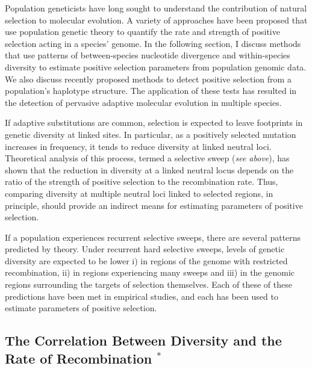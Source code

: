 Population geneticists have long sought to understand the contribution of natural selection to molecular evolution. A variety of approaches have been proposed that use population genetic theory to quantify the rate and strength of positive selection acting in a species’ genome. In the following section, I discuss methods that use patterns of between-species nucleotide divergence and within-species diversity to estimate positive selection parameters from population genomic data. We also discuss recently proposed methods to detect positive selection from a population’s haplotype structure. The application of these tests has resulted in the detection of pervasive adaptive molecular evolution in multiple species.
 
If adaptive substitutions are common, selection is expected to leave footprints in genetic diversity at linked sites. In particular, as a positively selected mutation increases in frequency, it tends to reduce diversity at linked neutral loci. Theoretical analysis of this process, termed a selective sweep (\textit{see above}), has shown that the reduction in diversity at a linked neutral locus depends on the ratio of the strength of positive selection to the recombination rate. Thus, comparing diversity at multiple neutral loci linked to selected regions, in principle, should provide an indirect means for estimating parameters of positive selection.

If a population experiences recurrent selective sweeps, there are several patterns predicted by theory. Under recurrent hard selective sweeps, levels of genetic diversity are expected to be lower i) in regions of the genome with restricted recombination, ii) in regions experiencing many sweeps and iii) in the genomic regions surrounding the targets of selection themselves. Each of these of these predictions have been met in empirical studies, and each has been used to estimate parameters of positive selection.

\subsection[The correlation between diversity and the rate of recombination]{The Correlation Between Diversity and the Rate of Recombination $^*$}


